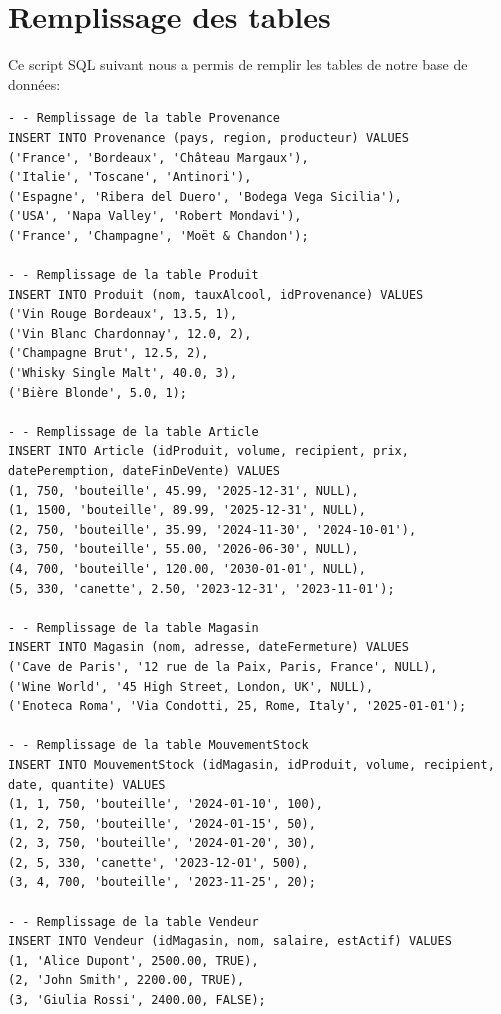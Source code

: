 \documentclass[12pt]{report}
\begin{document}
    \section*{Remplissage des tables}

    Ce script SQL suivant nous a permis de remplir les tables de notre base de données:
    \newline
    \newline
    \begin{lstlisting}[breaklines=true]
- - Remplissage de la table Provenance
INSERT INTO Provenance (pays, region, producteur) VALUES
('France', 'Bordeaux', 'Château Margaux'),
('Italie', 'Toscane', 'Antinori'),
('Espagne', 'Ribera del Duero', 'Bodega Vega Sicilia'),
('USA', 'Napa Valley', 'Robert Mondavi'),
('France', 'Champagne', 'Moët & Chandon');

- - Remplissage de la table Produit
INSERT INTO Produit (nom, tauxAlcool, idProvenance) VALUES
('Vin Rouge Bordeaux', 13.5, 1),
('Vin Blanc Chardonnay', 12.0, 2),
('Champagne Brut', 12.5, 2),
('Whisky Single Malt', 40.0, 3),
('Bière Blonde', 5.0, 1);

- - Remplissage de la table Article
INSERT INTO Article (idProduit, volume, recipient, prix, datePeremption, dateFinDeVente) VALUES
(1, 750, 'bouteille', 45.99, '2025-12-31', NULL),
(1, 1500, 'bouteille', 89.99, '2025-12-31', NULL),
(2, 750, 'bouteille', 35.99, '2024-11-30', '2024-10-01'),
(3, 750, 'bouteille', 55.00, '2026-06-30', NULL),
(4, 700, 'bouteille', 120.00, '2030-01-01', NULL),
(5, 330, 'canette', 2.50, '2023-12-31', '2023-11-01');

- - Remplissage de la table Magasin
INSERT INTO Magasin (nom, adresse, dateFermeture) VALUES
('Cave de Paris', '12 rue de la Paix, Paris, France', NULL),
('Wine World', '45 High Street, London, UK', NULL),
('Enoteca Roma', 'Via Condotti, 25, Rome, Italy', '2025-01-01');

- - Remplissage de la table MouvementStock
INSERT INTO MouvementStock (idMagasin, idProduit, volume, recipient, date, quantite) VALUES
(1, 1, 750, 'bouteille', '2024-01-10', 100),
(1, 2, 750, 'bouteille', '2024-01-15', 50),
(2, 3, 750, 'bouteille', '2024-01-20', 30),
(2, 5, 330, 'canette', '2023-12-01', 500),
(3, 4, 700, 'bouteille', '2023-11-25', 20);

- - Remplissage de la table Vendeur
INSERT INTO Vendeur (idMagasin, nom, salaire, estActif) VALUES
(1, 'Alice Dupont', 2500.00, TRUE),
(2, 'John Smith', 2200.00, TRUE),
(3, 'Giulia Rossi', 2400.00, FALSE);


\end{lstlisting}
\end{document}
